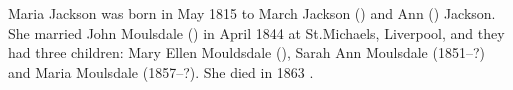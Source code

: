 
Maria Jackson was born in May 1815 to March Jackson () and Ann () Jackson. She married John Moulsdale () in April 1844 at St.Michaels, Liverpool, and they had three children:
Mary Ellen Mouldsdale (), Sarah Ann Moulsdale (1851--?) and Maria Moulsdale (1857--?).
She died in 1863 \cite{MariaJacksonDeath}.
